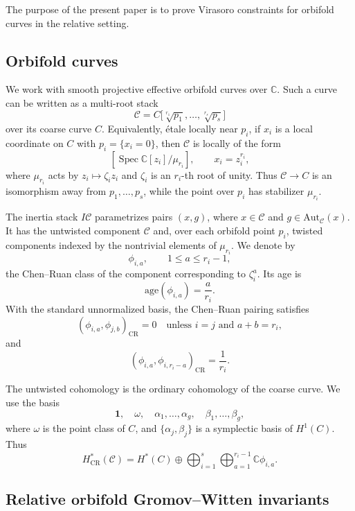 \documentclass[letterpaper,12pt]{amsart}
\theoremstyle{definition}
\newcommand{\id}{\mathbf 1}
\newcommand{\C}{\mathbb C}
\newcommand{\cC}{\mathcal C}
\newcommand{\CR}{\mathrm{CR}}
\newcommand{\age}{\mathrm{age}}
\newcommand{\Aut}{\mathrm{Aut}}
\DeclareMathOperator{\Spec}{Spec}
\numberwithin{equation}{section}
\begin{document}
The purpose of the present paper is to prove Virasoro constraints for orbifold curves in the relative setting.

\subsection{Orbifold curves}
We work with smooth projective effective orbifold curves over $\C$. Such a curve can be written as a multi-root stack
\begin{equation*}
  \cC=C\bigl[\sqrt[r_1]{p_1},\ldots,\sqrt[r_s]{p_s}\bigr]
\end{equation*}
over its coarse curve $C$. Equivalently, \'etale locally near \(p_i\), if \(x_i\) is a local coordinate on \(C\) with \(p_i=\{x_i=0\}\), then \(\cC\) is locally of the form
\[
  [\Spec \mathbb{C}[z_i]/\mu_{r_i}],  \qquad x_i=z_i^{r_i},
\]
where \(\mu_{r_i}\) acts by \(z_i\mapsto \zeta_i z_i\) and \(\zeta_i\) is an \(r_i\)-th root of unity. Thus \(\cC\to C\) is an isomorphism away from \(p_1,\ldots,p_s\), while the point over \(p_i\) has stabilizer \(\mu_{r_i}\).

The inertia stack \(I\cC\) parametrizes pairs \((x,g)\), where \(x\in \cC\) and \(g\in\Aut_{\cC}(x)\).  It has the untwisted component \(\cC\) and, over each orbifold point \(p_i\), twisted components indexed by the nontrivial elements of \(\mu_{r_i}\).  We denote by
\[
  \phi_{i,a},\qquad 1\le a\le r_i-1,
\]
the Chen--Ruan class of the component corresponding to \(\zeta^a_i\).  Its age is
\[
  \age(\phi_{i,a})=\frac{a}{r_i}.
\]
With the standard unnormalized basis, the Chen--Ruan pairing satisfies
\[
  (\phi_{i,a},\phi_{j,b})_{\CR}=0
  \quad\text{unless }i=j\text{ and }a+b=r_i,
\]
and
\[
  (\phi_{i,a},\phi_{i,r_i-a})_{\CR}=\frac{1}{r_i}.
\]

The untwisted cohomology is the ordinary cohomology of the coarse curve.  We use the basis
\[
  \id,\quad \omega,\quad
  \alpha_1,\ldots,\alpha_g,\quad
  \beta_1,\ldots,\beta_g,
\]
where \(\omega\) is the point class of $C$, and \(\{\alpha_j,\beta_j\}\) is a symplectic basis of \(H^1(C)\).  Thus
\[
 H^*_{\CR}(\cC)=H^*(C)\oplus
 \bigoplus_{i=1}^s\bigoplus_{a=1}^{r_i-1}\C\phi_{i,a}.
\]

\subsection{Relative orbifold Gromov--Witten invariants}\label{section-relativeorbifoldGW}
\end{document}
